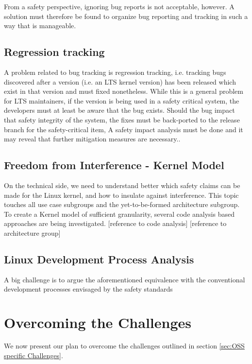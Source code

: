 \documentclass[12pt]{../Common_files/ElisaPaper}
\begin{document}
From a safety perspective, 
ignoring bug reports is not acceptable, however. 
A solution must therefore be found to organize bug reporting and tracking in such a way that is manageable.

\subsection{Regression tracking}
A problem related to bug tracking is regression tracking, 
i.e. tracking bugs discovered after 
a version (i.e. an LTS kernel version) has been released
which exist in that version
and 
must fixed nonetheless.
While this is a general problem for LTS maintainers,
if the version is being used in a safety critical system, 
the developers must at least be aware that the bug exists.
Should the bug impact that safety integrity of the system, 
the fixes must be back-ported to the release branch for the safety-critical item, 
A safety impact analysis must be done and it may reveal that further mitigation measures are necessary..



\subsection{Freedom from Interference - Kernel Model}
On the technical side, we need to understand better which safety claims can be made for the Linux kernel, 
and how to insulate against interference. 
This topic touches all use case subgroups and the yet-to-be-formed architecture subgroup.
To create a Kernel model of sufficient granularity, 
several code analysis based approaches are being investigated.
[reference to code analysis]
[reference to architecture group]

\subsection{Linux Development Process Analysis}
A big challenge is to argue the aforementioned equivalence with the conventional development processes envisaged by the safety standards 


\section{Overcoming the Challenges}
We now present our plan to overcome the challenges outlined in section \ref{sec:OSS specific Challenges}.
\end{document}
